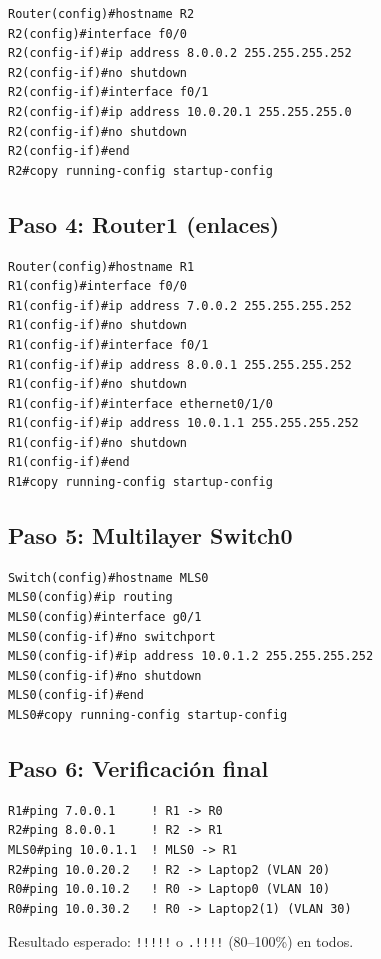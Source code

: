 \documentclass[11pt,a4paper]{report}
\begin{document}
\begin{lstlisting}
Router(config)#hostname R2
R2(config)#interface f0/0
R2(config-if)#ip address 8.0.0.2 255.255.255.252
R2(config-if)#no shutdown
R2(config-if)#interface f0/1
R2(config-if)#ip address 10.0.20.1 255.255.255.0
R2(config-if)#no shutdown
R2(config-if)#end
R2#copy running-config startup-config
\end{lstlisting}

\subsection{Paso 4: Router1 (enlaces)}

\begin{lstlisting}
Router(config)#hostname R1
R1(config)#interface f0/0
R1(config-if)#ip address 7.0.0.2 255.255.255.252
R1(config-if)#no shutdown
R1(config-if)#interface f0/1
R1(config-if)#ip address 8.0.0.1 255.255.255.252
R1(config-if)#no shutdown
R1(config-if)#interface ethernet0/1/0
R1(config-if)#ip address 10.0.1.1 255.255.255.252
R1(config-if)#no shutdown
R1(config-if)#end
R1#copy running-config startup-config
\end{lstlisting}

\subsection{Paso 5: Multilayer Switch0}

\begin{lstlisting}
Switch(config)#hostname MLS0
MLS0(config)#ip routing
MLS0(config)#interface g0/1
MLS0(config-if)#no switchport
MLS0(config-if)#ip address 10.0.1.2 255.255.255.252
MLS0(config-if)#no shutdown
MLS0(config-if)#end
MLS0#copy running-config startup-config
\end{lstlisting}

\subsection{Paso 6: Verificación final}

\begin{lstlisting}
R1#ping 7.0.0.1     ! R1 -> R0
R2#ping 8.0.0.1     ! R2 -> R1
MLS0#ping 10.0.1.1  ! MLS0 -> R1
R2#ping 10.0.20.2   ! R2 -> Laptop2 (VLAN 20)
R0#ping 10.0.10.2   ! R0 -> Laptop0 (VLAN 10)
R0#ping 10.0.30.2   ! R0 -> Laptop2(1) (VLAN 30)
\end{lstlisting}

Resultado esperado: \texttt{!!!!!} o \texttt{.!!!!} (80--100\%) en todos.
\end{document}
